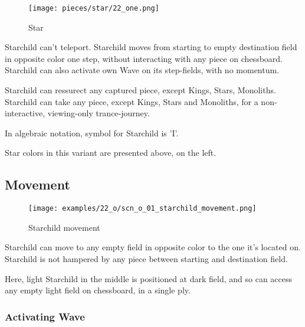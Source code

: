 \noindent
\begin{wrapfigure}[11]{l}{0.4\textwidth}
\centering
\texttt{[image: pieces/star/22\_one.png]}
\caption{Star}
\label{fig:star/22_one}
\end{wrapfigure}
Starchild can't teleport. Starchild moves from starting to empty destination field in
opposite color one step, without interacting with any piece on chessboard. Starchild
can also activate own Wave on its step-fields, with no momentum.

Starchild can ressurect any captured piece, except Kings, Stars, Monoliths.
Starchild can take any piece, except Kings, Stars and Monoliths, for a non-interactive,
viewing-only trance-journey.

In algebraic notation, symbol for Starchild is 'I'.

Star colors in this variant are presented above, on the left.

\clearpage %

\subsection*{Movement}

\vspace*{-1.1\baselineskip}
\noindent
\begin{figure}[!h]
\texttt{[image: examples/22\_o/scn\_o\_01\_starchild\_movement.png]}
\caption{Starchild movement}
\label{fig:scn_o_01_starchild_movement}
\end{figure}

Starchild can move to any empty field in opposite color to the one it's located on.
Starchild is not hampered by any piece between starting and destination field.

Here, light Starchild in the middle is positioned at dark field, and so can access
any empty light field on chessboard, in a single ply.

\clearpage %

\subsubsection*{Activating Wave}

